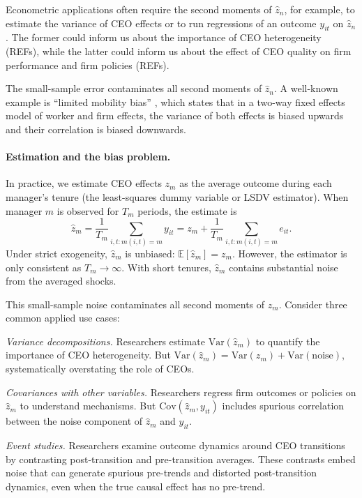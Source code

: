 \documentclass[11pt,a4paper]{article}
\newcommand{\Var}{\text{Var}}
\newcommand{\Cov}{\text{Cov}}
\begin{document}
Econometric applications often require the second moments of $\hat z_n$, for example, to estimate the variance of CEO effects or to run regressions of an outcome $y_{it}$ on $\hat z_n$. The former could inform us about the importance of CEO heterogeneity (REFs), while the latter could inform us about the effect of CEO quality on firm performance and firm policies (REFs). 

The small-sample error contaminates all second moments of $\hat z_n$. A well-known example is ``limited mobility bias'' \citep{andrews2008high}, which states that in a two-way fixed effects model of worker and firm effects, the variance of both effects is biased upwards and their correlation is biased downwards.


\newenvironment{example}{\par\noindent\textbf{Example.}\ }{\par}

\paragraph{Estimation and the bias problem.} In practice, we estimate CEO effects $z_m$ as the average outcome during each manager's tenure (the least-squares dummy variable or LSDV estimator). When manager $m$ is observed for $T_m$ periods, the estimate is
$$
\hat z_m = \frac{1}{T_m}\sum_{i,t:m(i,t)=m} y_{it} = z_m + \frac{1}{T_m}\sum_{i,t:m(i,t)=m} e_{it}.
$$
Under strict exogeneity, $\hat z_m$ is unbiased: $\mathbb E[\hat z_m] = z_m$. However, the estimator is only consistent as $T_m\to\infty$. With short tenures, $\hat z_m$ contains substantial noise from the averaged shocks.

This small-sample noise contaminates all second moments of $\hat z_m$. Consider three common applied use cases:

\textit{Variance decompositions.} Researchers estimate $\Var(\hat z_m)$ to quantify the importance of CEO heterogeneity. But $\Var(\hat z_m) = \Var(z_m) + \Var(\text{noise})$, systematically overstating the role of CEOs.

\textit{Covariances with other variables.} Researchers regress firm outcomes or policies on $\hat z_m$ to understand mechanisms. But $\Cov(\hat z_m, y_{it})$ includes spurious correlation between the noise component of $\hat z_m$ and $y_{it}$.

\textit{Event studies.} Researchers examine outcome dynamics around CEO transitions by contrasting post-transition and pre-transition averages. These contrasts embed noise that can generate spurious pre-trends and distorted post-transition dynamics, even when the true causal effect has no pre-trend.
\end{document}
